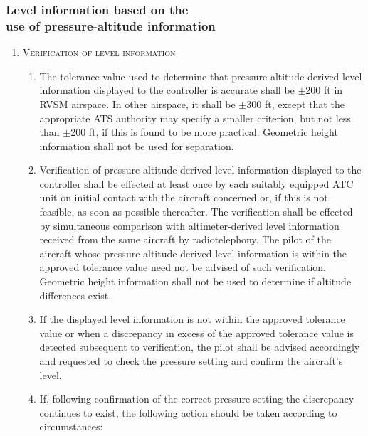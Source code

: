 \documentclass[../main.tex]{subfiles}
\begin{document}
    \subsubsection[Level information based on the use of pressure-altitude information]{Level information based on the \\ use of pressure-altitude information}

    \begin{enumerate}[itemsep=0.2cm]\centering
        \item \textsc{Verification of level information}
        \begin{enumerate}
            \item The tolerance value used to determine that pressure-altitude-derived level information displayed to the controller is accurate shall be $\pm$200 ft in RVSM airspace. In other airspace, it shall be $\pm$300 ft, except that the appropriate ATS authority may specify a smaller criterion, but not less than $\pm$200 ft, if this is found to be more practical. Geometric height information shall not be used for separation.
            \item Verification of pressure-altitude-derived level information displayed to the controller shall be effected at least once by each suitably equipped ATC unit on initial contact with the aircraft concerned or, if this is not feasible, as soon as possible thereafter. The verification shall be effected by simultaneous comparison with altimeter-derived level information received from the same aircraft by radiotelephony. The pilot of the aircraft whose pressure-altitude-derived level information is within the approved tolerance value need not be advised of such verification. Geometric height information shall not be used to determine if altitude differences exist.
            \item If the displayed level information is not within the approved tolerance value or when a discrepancy in excess of the approved tolerance value is detected subsequent to verification, the pilot shall be advised accordingly and requested to check the pressure setting and confirm the aircraft’s level.
            \item If, following confirmation of the correct pressure setting the discrepancy continues to exist, the following action should be taken according to circumstances:


\end{enumerate}
\end{enumerate}
\end{document}

